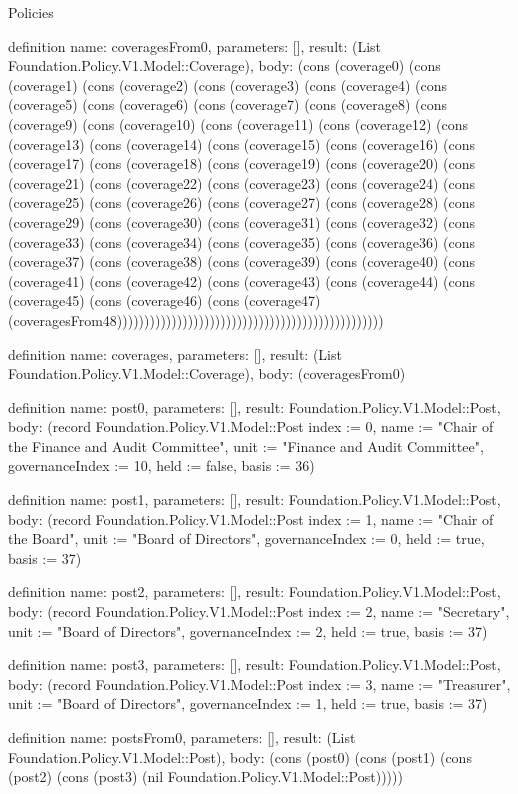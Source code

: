 \begin{lexlean}{Policies}
\begin{semanticmodule}
definition{
  name: coveragesFrom0,
  parameters: [],
  result: (List Foundation.Policy.V1.Model::Coverage),
  body: (cons (coverage0) (cons (coverage1) (cons (coverage2) (cons (coverage3) (cons (coverage4) (cons (coverage5) (cons (coverage6) (cons (coverage7) (cons (coverage8) (cons (coverage9) (cons (coverage10) (cons (coverage11) (cons (coverage12) (cons (coverage13) (cons (coverage14) (cons (coverage15) (cons (coverage16) (cons (coverage17) (cons (coverage18) (cons (coverage19) (cons (coverage20) (cons (coverage21) (cons (coverage22) (cons (coverage23) (cons (coverage24) (cons (coverage25) (cons (coverage26) (cons (coverage27) (cons (coverage28) (cons (coverage29) (cons (coverage30) (cons (coverage31) (cons (coverage32) (cons (coverage33) (cons (coverage34) (cons (coverage35) (cons (coverage36) (cons (coverage37) (cons (coverage38) (cons (coverage39) (cons (coverage40) (cons (coverage41) (cons (coverage42) (cons (coverage43) (cons (coverage44) (cons (coverage45) (cons (coverage46) (cons (coverage47) (coveragesFrom48)))))))))))))))))))))))))))))))))))))))))))))))))
}

definition{
  name: coverages,
  parameters: [],
  result: (List Foundation.Policy.V1.Model::Coverage),
  body: (coveragesFrom0)
}

definition{
  name: post0,
  parameters: [],
  result: Foundation.Policy.V1.Model::Post,
  body: (record Foundation.Policy.V1.Model::Post {index := 0, name := "Chair of the Finance and Audit Committee", unit := "Finance and Audit Committee", governanceIndex := 10, held := false, basis := 36})
}

definition{
  name: post1,
  parameters: [],
  result: Foundation.Policy.V1.Model::Post,
  body: (record Foundation.Policy.V1.Model::Post {index := 1, name := "Chair of the Board", unit := "Board of Directors", governanceIndex := 0, held := true, basis := 37})
}

definition{
  name: post2,
  parameters: [],
  result: Foundation.Policy.V1.Model::Post,
  body: (record Foundation.Policy.V1.Model::Post {index := 2, name := "Secretary", unit := "Board of Directors", governanceIndex := 2, held := true, basis := 37})
}

definition{
  name: post3,
  parameters: [],
  result: Foundation.Policy.V1.Model::Post,
  body: (record Foundation.Policy.V1.Model::Post {index := 3, name := "Treasurer", unit := "Board of Directors", governanceIndex := 1, held := true, basis := 37})
}

definition{
  name: postsFrom0,
  parameters: [],
  result: (List Foundation.Policy.V1.Model::Post),
  body: (cons (post0) (cons (post1) (cons (post2) (cons (post3) (nil Foundation.Policy.V1.Model::Post)))))
}


\end{semanticmodule}
\end{lexlean}
